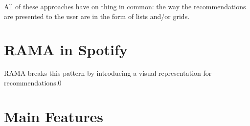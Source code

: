 \documentclass{article}
\begin{document}
    All of these approaches have on thing in common: the way the recommendations are presented to the user are in the form of lists and/or grids.



  \section{RAMA in Spotify} %
  \label{sec:rama}
  
  RAMA breaks this pattern by introducing a visual representation for recommendations.0


  \section{Main Features} %
  \label{sec:features}
  










\end{document}
